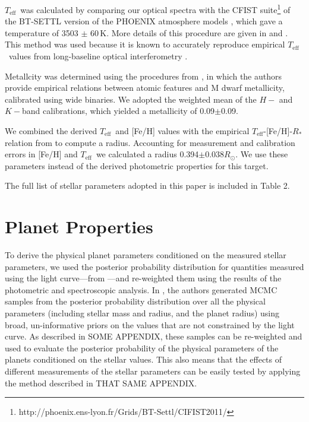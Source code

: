 \documentclass{emulateapj}
\newcommand\teff{\ensuremath{T_\text{eff}}}
\newcommand{\paperit}{\citet{Foreman-Mackey15}}
\begin{document}
\teff\ was calculated by comparing our optical spectra with the CFIST
suite\footnote{http://phoenix.ens-lyon.fr/Grids/BT-Settl/CIFIST2011/} of the BT-SETTL
version of the PHOENIX atmosphere models \citep{Allard13}, which gave a temperature
of 3503 $\pm$ 60\,K.
More details of this procedure are given in \citet{Mann14} and
\citet{Gaidos14}.
This method was used because it is known to accurately reproduce empirical
\teff\ values from long-baseline optical interferometry \citet{Boyajian12}.

Metallcity was determined using the procedures from \citet{Mann13a}, in which the
authors provide empirical relations between atomic features and M dwarf
metallicity, calibrated using wide binaries.
We adopted the weighted mean of the $H-$ and $K-$band calibrations,
which yielded a metallicity of 0.09$\pm$0.09.

We combined the derived \teff\ and [Fe/H] values with the empirical
\teff-[Fe/H]-$R_*$ relation from \citet{Mann15} to compute a radius.
Accounting for measurement and calibration errors in [Fe/H] and \teff\ we calculated
a radius 0.394$\pm0.038R_\odot$.
We use these parameters instead of the derived photometric properties for this target.

The full list of stellar parameters adopted in this paper is included in
Table 2.

\section{Planet Properties}

To derive the physical planet parameters conditioned on the measured stellar
parameters, we used the posterior probability distribution for quantities
measured using the light curve---from \paperit---and re-weighted them using
the results of the photometric and spectroscopic analysis.
In \paperit, the authors generated MCMC samples from the posterior
probability distribution over all the physical parameters (including stellar
mass and radius, and the planet radius) using broad, un-informative priors on
the values that are not constrained by the light curve.
As described in SOME APPENDIX, these samples can be re-weighted and used to
evaluate the posterior probability of the physical parameters of the planets
conditioned on the stellar values.
This also means that the effects of different measurements of the stellar
parameters can be easily tested by applying the method described in THAT SAME
APPENDIX.
\end{document}
